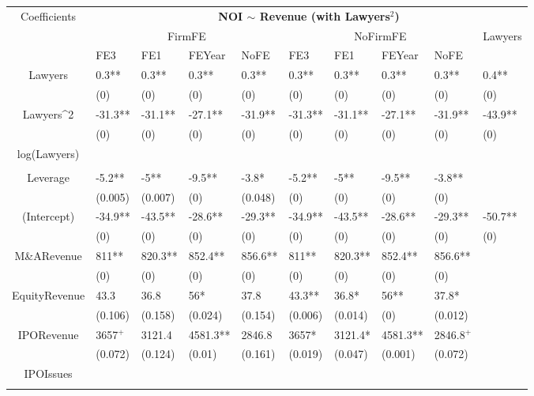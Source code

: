 \documentclass{article}
\begin{document}
\begin{table}[H]
\centering
\begin{tabular}{|clllllllll|}
\hline
\multirow{3}{*}{Coefficients} & \multicolumn{9}{c|}{\textbf{NOI $\sim$ Revenue (with Lawyers$^2$)}} \\
\cline{2-10}
& \multicolumn{4}{c}{FirmFE} & \multicolumn{4}{c}{NoFirmFE} & \multirow{2}{*}{Lawyers} \\
\cline{2-9}
& FE3 & FE1 & FEYear & NoFE & FE3 & FE1 & FEYear & NoFE &  \\
\hline
 
Lawyers & 0.3** & 0.3** & 0.3** & 0.3** & 0.3** & 0.3** & 0.3** & 0.3** & 0.4** \\ 
   & (0) & (0) & (0) & (0) & (0) & (0) & (0) & (0) & (0) \\ 
  Lawyers^2 & -31.3** & -31.1** & -27.1** & -31.9** & -31.3** & -31.1** & -27.1** & -31.9** & -43.9** \\ 
   & (0) & (0) & (0) & (0) & (0) & (0) & (0) & (0) & (0) \\ 
  log(Lawyers) &  &  &  &  &  &  &  &  &  \\ 
   &  &  &  &  &  &  &  &  &  \\ 
  Leverage & -5.2** & -5** & -9.5** & -3.8* & -5.2** & -5** & -9.5** & -3.8** &  \\ 
   & (0.005) & (0.007) & (0) & (0.048) & (0) & (0) & (0) & (0) &  \\ 
  (Intercept) & -34.9** & -43.5** & -28.6** & -29.3** & -34.9** & -43.5** & -28.6** & -29.3** & -50.7** \\ 
   & (0) & (0) & (0) & (0) & (0) & (0) & (0) & (0) & (0) \\ 
  M\&ARevenue & 811** & 820.3** & 852.4** & 856.6** & 811** & 820.3** & 852.4** & 856.6** &  \\ 
   & (0) & (0) & (0) & (0) & (0) & (0) & (0) & (0) &  \\ 
  EquityRevenue & 43.3 & 36.8 & 56* & 37.8 & 43.3** & 36.8* & 56** & 37.8* &  \\ 
   & (0.106) & (0.158) & (0.024) & (0.154) & (0.006) & (0.014) & (0) & (0.012) &  \\ 
  IPORevenue & 3657$^{+}$ & 3121.4 & 4581.3** & 2846.8 & 3657* & 3121.4* & 4581.3** & 2846.8$^{+}$ &  \\ 
   & (0.072) & (0.124) & (0.01) & (0.161) & (0.019) & (0.047) & (0.001) & (0.072) &  \\ 
  IPOIssues &  &  &  &  &  &  &  &  &  \\ 
   &  &  &  &  &  &  &  &  &  \\ 

\end{tabular}
\end{table}
\end{document}
